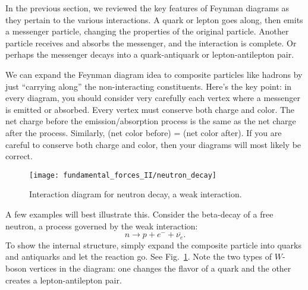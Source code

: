 In the previous section, we reviewed the key features of Feynman
diagrams as they pertain to the various interactions.  A quark or
lepton goes along, then emits a messenger particle, changing the
properties of the original particle.  Another particle receives and
absorbs the messenger, and the interaction is complete.  Or perhaps
the messenger decays into a quark-antiquark or lepton-antilepton pair.

We can expand the Feynman diagram idea to composite particles like
hadrons by just ``carrying along'' the non-interacting constituents.
Here's the key point: in every diagram, you should consider very
carefully each vertex where a messenger is emitted or absorbed.  Every
vertex must conserve both charge and color.  The net charge before the
emission/absorption process is the same as the net charge after the
process.  Similarly, (net color before) = (net color after).  If you
are careful to conserve both charge and color, then your diagrams will
most likely be correct.

\begin{figure}[tbp]
\begin{minipage}{7cm}
\caption{Interaction diagram for neutron decay, a weak interaction.}
\label{fig:neutron_decay}
\end{minipage}
\hfill
\begin{minipage}{4cm}
\texttt{[image: fundamental\_forces\_II/neutron\_decay]}
\end{minipage}
\end{figure}

A few examples will best illustrate this.  Consider the beta-decay of
a free neutron, a process governed by the weak interaction:
\begin{equation}
      n \to p + e^- + \overline{\nu_e}  .
\end{equation}
To show the internal structure, simply expand the composite particle
into quarks and antiquarks and let the reaction go.  See
Fig.~\ref{fig:neutron_decay}.  Note the two types of $W$-boson
vertices in the diagram: one changes the flavor of a quark and the
other creates a lepton-antilepton pair.

